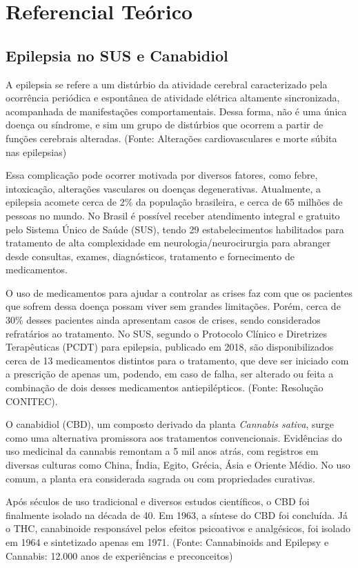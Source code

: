 \documentclass[article,a4paper,12pt,brazil,sumario=tradicional]{abntex2}
\begin{document}
\section{Referencial Teórico}

\subsection{Epilepsia no SUS e Canabidiol}
A epilepsia se refere a um distúrbio da atividade cerebral caracterizado pela ocorrência periódica e espontânea de atividade elétrica altamente sincronizada, acompanhada de manifestações comportamentais. Dessa forma, não é uma única doença ou síndrome, e sim um grupo de distúrbios que ocorrem a partir de funções cerebrais alteradas. (Fonte: Alterações cardiovasculares e morte súbita nas epilepsias)

Essa complicação pode ocorrer motivada por diversos fatores, como febre, intoxicação, alterações vasculares ou doenças degenerativas. Atualmente, a epilepsia acomete cerca de 2\% da população brasileira, e cerca de 65 milhões de pessoas no mundo. No Brasil é possível receber atendimento integral e gratuito pelo Sistema Único de Saúde (SUS), tendo 29 estabelecimentos habilitados para tratamento de alta complexidade em neurologia/neurocirurgia para abranger desde consultas, exames, diagnósticos, tratamento e fornecimento de medicamentos.

O uso de medicamentos para ajudar a controlar as crises faz com que os pacientes que sofrem dessa doença possam viver sem grandes limitações. Porém, cerca de 30\% desses pacientes ainda apresentam casos de crises, sendo considerados refratários ao tratamento. No SUS, segundo o Protocolo Clínico e Diretrizes Terapêuticas (PCDT) para epilepsia, publicado em 2018, são disponibilizados cerca de 13 medicamentos distintos para o tratamento, que deve ser iniciado com a prescrição de apenas um, podendo, em caso de falha, ser alterado ou feita a combinação de dois desses medicamentos antiepilépticos. (Fonte: Resolução CONITEC).

O canabidiol (CBD), um composto derivado da planta \textit{Cannabis sativa}, surge como uma alternativa promissora aos tratamentos convencionais. Evidências do uso medicinal da cannabis remontam a 5 mil anos atrás, com registros em diversas culturas como China, Índia, Egito, Grécia, Ásia e Oriente Médio. No uso comum, a planta era considerada sagrada ou com propriedades curativas.

Após séculos de uso tradicional e diversos estudos científicos, o CBD foi finalmente isolado na década de 40. Em 1963, a síntese do CBD foi concluída. Já o THC, canabinoide responsável pelos efeitos psicoativos e analgésicos, foi isolado em 1964 e sintetizado apenas em 1971. (Fonte: Cannabinoids and Epilepsy e Cannabis: 12.000 anos de experiências e preconceitos)
\end{document}
